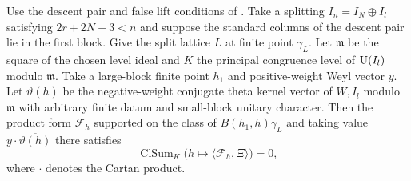 \begin{lemma}
\label{lem:c-false-divided-period}
\emitthmsource
Use the descent pair and false lift conditions of . Take a splitting $I_n=I_N\oplus I_l$ satisfying $2r+2N+3<n$ and suppose the standard columns of the descent pair lie in the first block. Give the split lattice $L$ at finite point $\gamma_L$. Let $\mathfrak m$ be the square of the chosen level ideal and $K$ the principal congruence level of $\operatorname{U}(I_l)$ modulo $\mathfrak m$. Take a large-block finite point $h_1$ and positive-weight Weyl vector $y$. Let $\vartheta(h)$ be the negative-weight conjugate theta kernel vector of $W,I_l$ modulo $\mathfrak m$ with arbitrary finite datum and small-block unitary character. Then the product form $\mathcal F_h$ supported on the class of $B(h_1,h)\gamma_L$ and taking value $y\cdot\overline{\vartheta(h)}$ there satisfies
\[
    \operatorname{ClSum}_K\bigl(h\mapsto
             \langle\mathcal F_h,\Xi\rangle\bigr)=0 ,
\]
where $\cdot$ denotes the Cartan product.
\end{lemma}

